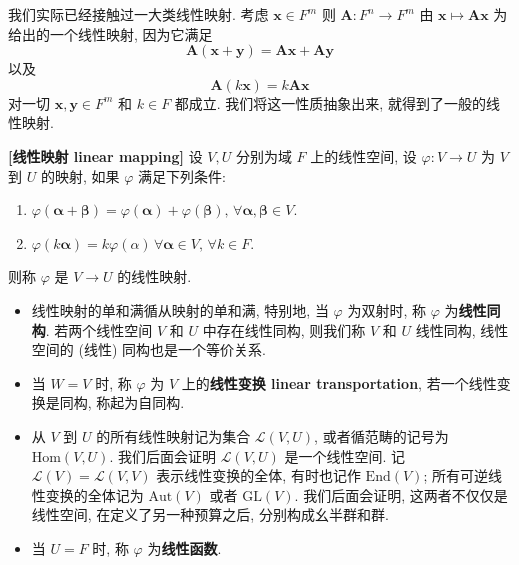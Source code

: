 \documentclass[UTF8]{book}
\begin{document}
我们实际已经接触过一大类线性映射. 考虑 $\boldsymbol{x} \in F^m$ 
则 $\boldsymbol{A}: F^n \to F^m$ 由 $\boldsymbol{x} \mapsto \boldsymbol{Ax}$ 
为给出的一个线性映射, 
因为它满足 
$$ \boldsymbol{A}(\boldsymbol{x}+\boldsymbol{y}) = 
\boldsymbol{A}\boldsymbol{x}+\boldsymbol{A}\boldsymbol{y}$$ 
以及 
$$  \boldsymbol{A}(k\boldsymbol{x}) = k\boldsymbol{Ax}$$ 
对一切 $\boldsymbol{x},\boldsymbol{y} \in F^m$ 和 $k \in F$ 都成立. 
我们将这一性质抽象出来, 就得到了一般的线性映射. 

\begin{definition}
    \textbf{[线性映射 linear mapping]} 
    设 $V,U$ 分别为域 $F$ 上的线性空间, 设
    $\varphi : V \to U$ 为 $V$ 到 $U$ 的映射, 
    如果 $\varphi$ 满足下列条件: 
    \begin{enumerate}[(1)]
        \item $\varphi(\boldsymbol{\alpha}+\boldsymbol{\beta})=
        \varphi(\boldsymbol{\alpha})+\varphi(\boldsymbol{\beta}),\,\forall 
        \boldsymbol{\alpha},\boldsymbol{\beta} \in V$.
        
        \item $\varphi(k\boldsymbol{\alpha})=k\varphi(\alpha)
        \, \forall \boldsymbol{\alpha}\in V,\,\forall k \in F$.
    \end{enumerate}
    则称 $\varphi$ 是 $ V \to U$ 的线性映射.

    \begin{itemize}
        \item 线性映射的单和满循从映射的单和满, 特别地, 当 $\varphi$ 为双射时, 
        称 $\varphi$ 为\textbf{线性同构}. 若两个线性空间 $V$ 和 $U$ 中存在线性同构, 
        则我们称 $V$ 和 $U$ 线性同构, 线性空间的 (线性) 同构也是一个等价关系. 
    
        \item 当 $W = V$ 时, 称 $\varphi$ 为 $V$ 上的\textbf{线性变换 linear transportation}, 
        若一个线性变换是同构, 称起为自同构. 

        \item 从 $V$ 到 $U$ 的所有线性映射记为集合 
        $ \mathcal{L}(V,U)$, 或者循范畴的记号为 $\mathrm{Hom}(V,U)$. 
        我们后面会证明 $ \mathcal{L}(V,U)$ 是一个线性空间. 
        记 $ \mathcal{L}(V) = \mathcal{L}(V,V)$ 表示线性变换的全体, 
        有时也记作 $\mathrm{End}(V)$; 所有可逆线性变换的全体记为 
        $\mathrm{Aut}(V)$ 或者 $\mathrm{GL}(V)$. 
        我们后面会证明, 这两者不仅仅是线性空间, 在定义了另一种预算之后, 
        分别构成幺半群和群. 

        \item 当 $U=F$ 时, 称 $\varphi$ 为\textbf{线性函数}. 
    \end{itemize}
\end{definition}
\end{document}
